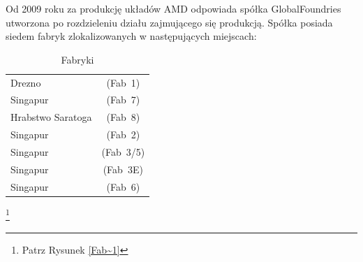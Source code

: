 \documentclass[a4paper,12pt]{article}
\begin{document}
Od 2009 roku za produkcję układów AMD odpowiada spółka GlobalFoundries utworzona po rozdzieleniu działu zajmującego się produkcją. Spółka posiada siedem fabryk zlokalizowanych w następujących miejscach:

\begin{table}[h]
\centering \caption{Fabryki}
\begin{tabular}{lc}
\hline
Drezno&(Fab~1)\\
Singapur&(Fab~7)\\
Hrabstwo Saratoga&(Fab~8)\\
Singapur&(Fab~2)\\
Singapur&(Fab~3/5)\\
Singapur&(Fab~3E)\\
Singapur&(Fab~6)\\
\end{tabular}
\end{table}

\footnote{Patrz Rysunek \ref{Fab~1}}
\end{document}
